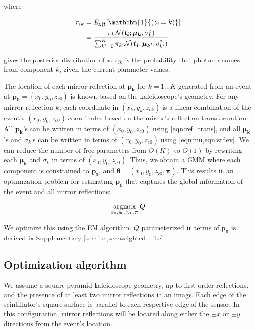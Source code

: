 where 
\begin{linenomath}
\begin{equation} \label{eqn:r_ik}
\begin{aligned}
r_{ik} & = E_{\bm{z}|\bm{t}}[\mathbbm{1}{(z_i=k)}] \\ & = \frac{\pi_k \mathcal{N}(\bm{t_i};\bm{\mu_k},{\sigma_k^2})}{\sum_{k'=0}^K \pi_{k'} \mathcal{N}(\bm{t_i};\bm{\mu_{k'}},{\sigma_{k'}^2})}
\end{aligned}
\end{equation}
\end{linenomath}
gives the posterior distribution of $\bm{z}$.
$r_{ik}$ is the probability that photon $i$ comes from component $k$, given 
the current parameter values.

The location of each mirror reflection at $\bm{p_k}$ for $k=1...K$ generated from 
an event at $\bm{p_0}=(x_0,y_0,z_{c0})$ is known based on the kaleidoscope's geometry.
For any mirror reflection $k$, each coordinate in $(x_k,y_k,z_{ck})$ is a linear 
combination of the event's $(x_0,y_0,z_{c0})$ coordinates based on the mirror's 
reflection transformation.
All $\bm{p_k}$'s can be written in terms of $(x_0,y_0,z_{c0})$ using 
\cref{eqn:ref_trans}, and all $\bm{\mu_k}$'s and $\sigma_k$'s can be written in 
terms of $(x_0,y_0,z_{c0})$ using \cref{eqn:mu,eqn:stdev}.
We can reduce the number of free parameters from $O(K)$ 
to $O(1)$ by rewriting each $\bm{\mu_k}$ and $\sigma_k$ in terms of 
$(x_0,y_0,z_{c0})$.
Thus, we obtain a GMM where each component is constrained to $\bm{p_0}$, and 
$\bm{\theta}=(x_0,y_0,z_{c0},\bm{\pi})$.
This results in an optimization problem for estimating $\bm{p_0}$ that captures 
the global information of the event and all mirror reflections:
\begin{linenomath}
\begin{equation} \label{eqn:opti_prob}
\operatorname*{\arg\!\max}_{x_0,y_0,z_{c0},\bm{\pi}} Q
\end{equation}
\end{linenomath}
We optimize this using the EM algorithm.
$Q$ parameterized in terms of $\bm{p_0}$ is derived in Supplementary \cref*{sec:like,sec:weighted_like}.

\subsection{Optimization algorithm}
We assume a square pyramid kaleidoscope geometry, up to first-order reflections, 
and the presence of at least two mirror reflections in an image.
Each edge of the scintillator's square surface is parallel to each respective edge 
of the sensor.
In this configuration, mirror reflections will be located along either the 
$\pm x$ or $\pm y$ directions from the event's location.

